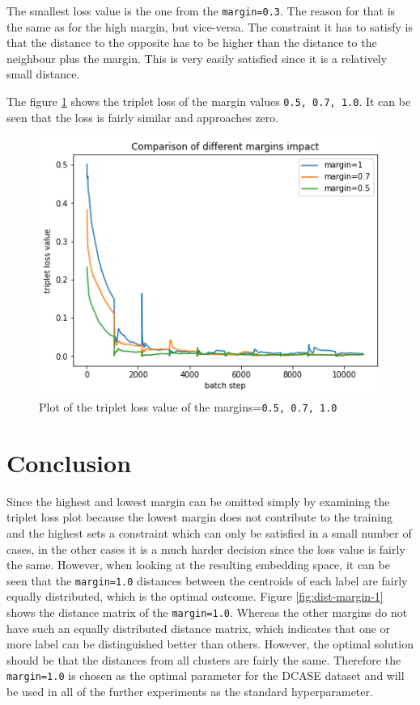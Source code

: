 \documentclass[twocolumn]{article}
\begin{document}
The smallest loss value is the one from the \texttt{margin=0.3}. The reason for that is the same as for the high margin, but vice-versa. The constraint it has to satisfy is that the distance to the opposite has to be higher than the distance to the neighbour plus the margin. This is very easily satisfied since it is a relatively small distance.

The figure \ref{fig:margin-5-7-10} shows the triplet loss of the margin values \texttt{0.5, 0.7, 1.0}. It can be seen that the loss is fairly similar and approaches zero.

\begin{figure}[t]
\centering
    \includegraphics[width=\linewidth]{assets/margin_5_7_10_plot.png}
    \caption{Plot of the triplet loss value of the margins=\texttt{0.5, 0.7, 1.0}}
    \label{fig:margin-5-7-10}
\end{figure}

\section{Conclusion}
Since the highest and lowest margin can be omitted simply by examining the triplet loss plot because the lowest margin does not contribute to the training and the highest sets a constraint which can only be satisfied in a small number of cases, in the other cases it is a much harder decision since the loss value is fairly the same. However, when looking at the resulting embedding space, it can be seen that the \texttt{margin=1.0} distances between the centroids of each label are fairly equally distributed, which is the optimal outcome. Figure \ref{fig:dist-margin-1} shows the distance matrix of the \texttt{margin=1.0}. Whereas the other margins do not have such an equally distributed distance matrix, which indicates that one or more label can be distinguished better than others. However, the optimal solution should be that the distances from all clusters are fairly the same. Therefore the \texttt{margin=1.0} is chosen as the optimal parameter for the DCASE dataset and will be used in all of the further experiments as the standard hyperparameter.
\end{document}
